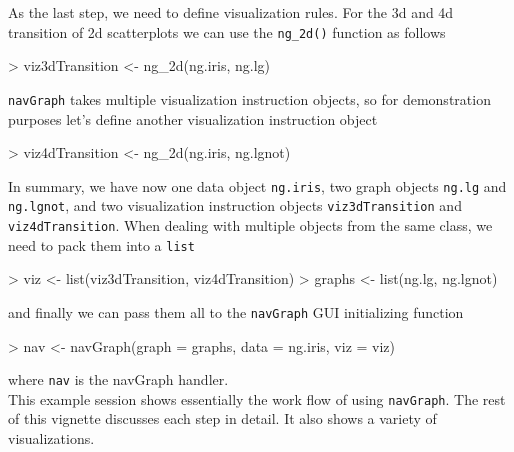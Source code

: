 \documentclass[12pt,oneside,titlepage,letter]{article}
\begin{document}
As the last step, we need to define visualization rules. For the 3d and 4d transition of 2d scatterplots we can use the \texttt{ng\_2d()} function as follows
\begin{Schunk}
\begin{Sinput}
> viz3dTransition <- ng_2d(ng.iris, ng.lg)
\end{Sinput}
\end{Schunk}
\texttt{navGraph} takes multiple visualization instruction objects, so for demonstration purposes let's define another visualization instruction object
\begin{Schunk}
\begin{Sinput}
> viz4dTransition <- ng_2d(ng.iris, ng.lgnot)
\end{Sinput}
\end{Schunk}
In summary, we have now one data object \texttt{ng.iris}, two graph objects \texttt{ng.lg} and \texttt{ng.lgnot}, and two visualization instruction objects \texttt{viz3dTransition} and \texttt{viz4dTransition}. When dealing with multiple objects from the same class, we need to pack them into a \texttt{list}
\begin{Schunk}
\begin{Sinput}
> viz <- list(viz3dTransition, viz4dTransition)
> graphs <- list(ng.lg, ng.lgnot)
\end{Sinput}
\end{Schunk}
and finally we can pass them all to the \texttt{navGraph} GUI initializing function
\begin{Schunk}
\begin{Sinput}
> nav <- navGraph(graph = graphs, data = ng.iris, viz = viz)
\end{Sinput}
\end{Schunk}
where \texttt{nav} is the navGraph handler.\\

This example session shows essentially the work flow of using \texttt{navGraph}. The rest of this vignette discusses each step in detail.  It also shows a variety of visualizations.
\end{document}
